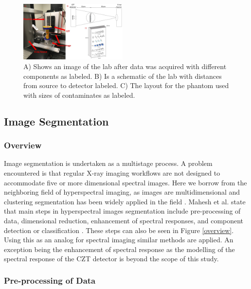 \documentclass[a4paper,11pt]{article}
\begin{document}
\begin{figure}
  
  \begin{center}
    \includegraphics[width=0.48\textwidth]{FullFigure.jpg}
  \end{center}
  
  \caption{A) Shows an image of the lab after data was acquired with different components as labeled. B) Is a schematic of the lab with distances from source to detector labeled. C) The layout for the phantom used with sizes of contaminates as labeled.}
  
\end{figure}

\subsection{Image Segmentation}
\subsubsection{Overview}

Image segmentation is undertaken as a multistage process. A problem encountered is that regular X-ray imaging workflows are not designed to accommodate five or more dimensional spectral images. Here we borrow from the neighboring field of hyperspectral imaging, as images are multidimensional and clustering segmentation has been widely applied in the field \cite{Murphy2018UnsupervisedDiffusion,Gillis2012HyperspectralGraphs,Noe2001PartialClustering}. Mahesh et al. state that main steps in hyperspectral images segmentation include pre-processing of data, dimensional reduction, enhancement of spectral responses, and component detection or classification \cite{mahesh}. These steps can also be seen in Figure \ref{overview}. Using this as an analog for spectral imaging similar methods are applied. An exception being the enhancement of spectral response as the modelling of the spectral response of the CZT detector is beyond the scope of this study.

\subsubsection{Pre-processing of Data}
\end{document}

